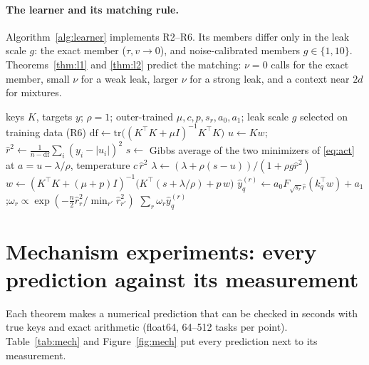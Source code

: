 \documentclass{article}
\theoremstyle{definition}
\theoremstyle{remark}
\newcommand{\dof}{\mathrm{df}}
\begin{document}
\paragraph{The learner and its matching rule.}
Algorithm~\ref{alg:learner} implements R2--R6.
Its members differ only in the leak scale $g$: the exact member ($\tau,v\to0$), and noise-calibrated members $g\in\{1,10\}$.
Theorems~\ref{thm:l1} and \ref{thm:l2} predict the matching: $\nu=0$ calls for the exact member, small $\nu$ for a weak leak, larger $\nu$ for a strong leak, and a context near $2d$ for mixtures.

\begin{algorithm}[t]
\caption{Self-iterating inner loop satisfying R2--R6 (R2 through the chain mixture) (per context; $R$ chains)}
\label{alg:learner}
\begin{algorithmic}[1]
\Require keys $K$, targets $y$; $\rho=1$; outer-trained $\mu,c,p,s_r,a_0,a_1$; leak scale $g$ selected on training data (R6)
\State $\dof\gets\mathrm{tr}\big((K^\top K+\mu I)^{-1}K^\top K\big)$
\State $u\gets Kw$;\quad $\hat r^2\gets\frac{1}{n-\dof}\sum_i(y_i-|u_i|)^2$ 
\State $s\gets$ Gibbs average of the two minimizers of \eqref{eq:act} at $a=u-\lambda/\rho$, temperature $c\,\hat r^2$ 
\State $\lambda\gets(\lambda+\rho(s-u))/(1+\rho g\hat r^2)$ 
\State $w\gets(K^\top K+(\mu+p)I)^{-1}\big(K^\top(s+\lambda/\rho)+p\,w\big)$ 
\EndFor
\State $\hat y_q^{(r)}\gets a_0F_{\sqrt{s_r}\hat r}(k_q^\top w)+a_1$;\quad $\omega_r\propto\exp(-\tfrac n2\hat r_r^2/\min_{r'}\hat r_{r'}^2)$ 
\EndFor
\State \Return $\sum_r\omega_r\hat y_q^{(r)}$
\end{algorithmic}
\end{algorithm}

\section{Mechanism experiments: every prediction against its measurement}
\label{sec:mech}

Each theorem makes a numerical prediction that can be checked in seconds with true keys and exact arithmetic (float64, 64--512 tasks per point). Table~\ref{tab:mech} and Figure~\ref{fig:mech} put every prediction next to its measurement.
\end{document}
